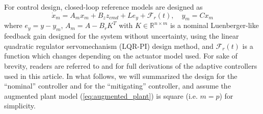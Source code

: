 \documentclass[english]{ifacconf}
\begin{document}
For control design, closed-loop reference models are designed as
\begin{equation}
\dot{x}_m = A_m x_m + B_z z_{cmd} + L e_y + \mathcal{F}_r(t), \quad y_m = C x_m
\end{equation}
where $e_y = y - y_m$, $A_m = A - B_r K^T$ with $K\in\mathbb{R}^{n\times m}$ is a nominal Luenberger-like feedback gain designed for the system without uncertainty, using the linear quadratic regulator servomechanism (LQR-PI) design method, and $\mathcal{F}_r(t)$ is a function which changes depending on the actuator model used. For sake of brevity, readers are referred to \cite{qu2016phd} and \cite{qu2016adaptive} for full derivations of the adaptive controllers used in this article. In what follows, we will summarized the design for the ``nominal'' controller and for the ``mitigating'' controller, and assume the augmented plant model (\ref{eq:augmented_plant}) is square (i.e. $m = p$) for simplicity.
 
\end{document}
